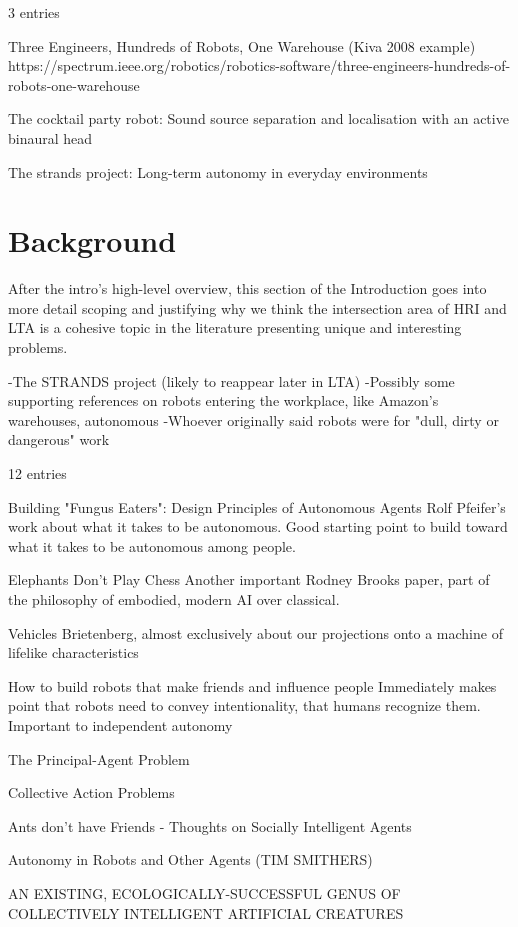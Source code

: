 \documentclass{sfuthesis}
\begin{document}
3 entries

Three Engineers, Hundreds of Robots, One Warehouse (Kiva 2008 example)
https://spectrum.ieee.org/robotics/robotics-software/three-engineers-hundreds-of-robots-one-warehouse

The cocktail party robot: Sound source separation and localisation with an active binaural head

The strands project: Long-term autonomy in everyday environments

\section{Background}

After the intro's high-level overview, this section of the Introduction goes into more detail scoping and justifying why we think the intersection area of HRI and LTA is a cohesive topic in the literature presenting unique and interesting problems.

-The STRANDS project (likely to reappear later in LTA)
-Possibly some supporting references on robots entering the workplace, like Amazon's warehouses, autonomous 
-Whoever originally said robots were for "dull, dirty or dangerous" work


12 entries

Building "Fungus Eaters": Design Principles of Autonomous Agents	Rolf Pfeifer's work about what it takes to be autonomous. Good starting point to build toward what it takes to be autonomous among people.

Elephants Don't Play Chess	Another important Rodney Brooks paper, part of the philosophy of embodied, modern AI over classical.

Vehicles	Brietenberg, almost exclusively about our projections onto a machine of lifelike characteristics

How to build robots that make friends and influence people	Immediately makes point that robots need to convey intentionality, that humans recognize them. Important to independent autonomy

The Principal-Agent Problem

Collective Action Problems

Ants don't have Friends - Thoughts on Socially Intelligent Agents

Autonomy in Robots and Other Agents (TIM SMITHERS)

AN EXISTING, ECOLOGICALLY-SUCCESSFUL GENUS OF COLLECTIVELY INTELLIGENT ARTIFICIAL CREATURES
\end{document}

